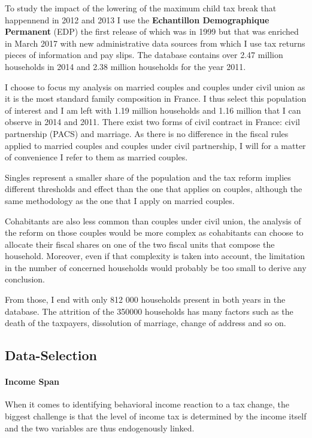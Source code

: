 To study the impact of the lowering of the maximum child tax break that happennend in 2012 and 2013 I use the \textbf{Echantillon Demographique Permanent} (EDP) the first release of which was in 1999 but that was enriched in March 2017 with new administrative data sources from which I use tax returns pieces of information and pay slips.
The database contains over 2.47 million households in 2014 and 2.38 million households for the year 2011.

I choose to focus my analysis on married couples and couples under civil union as it is the most standard family composition in France.
I thus select this population of interest and I am left with 1.19 million households and 1.16 million that I can observe in 2014 and 2011. There exist two forms of civil contract in France: civil partnership (PACS) and marriage. As there is no difference in the fiscal rules applied to married couples and couples under civil partnership, I will for a matter of convenience I  refer to them as married couples.



Singles represent a smaller share of the population and the tax reform implies different thresholds and effect than the one that applies on couples, although the same methodology as the one that I apply on married couples.


Cohabitants are also less common than couples under civil union, the analysis of the reform on those couples would be more complex as cohabitants can choose to allocate their fiscal shares on one of the two fiscal units that compose the household. Moreover, even if that complexity is taken into account, the limitation in the number of concerned households would probably be too small to derive any conclusion.
  
From those, I end with only 812 000 households present in both years in the database. The attrition of the 350000 households has many factors such as the death of the taxpayers, dissolution of marriage, change of address and so on.



\subsection{Data-Selection}
\paragraph{Income Span}
When it comes to identifying behavioral income reaction to a tax change, the biggest challenge is that the level of income tax is determined by the income itself and the two variables are thus endogenously linked.

